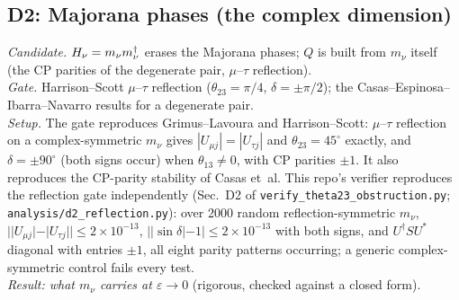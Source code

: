 \subsection{D2: Majorana phases (the complex dimension)}\label{sec:D2}
\emph{Candidate.} $H_\nu=m_\nu m_\nu^\dagger$ erases the Majorana phases; $Q$ is built from
$m_\nu$ itself (the CP parities of the degenerate pair, $\mu$--$\tau$ reflection).\\
\emph{Gate.} Harrison--Scott $\mu$--$\tau$ reflection ($\theta_{23}=\pi/4$, $\delta=\pm\pi/2$);
the Casas--Espinosa--Ibarra--Navarro results for a degenerate pair.\\
\emph{Setup.} The gate reproduces Grimus--Lavoura and Harrison--Scott: $\mu$--$\tau$ reflection on
a complex-symmetric $m_\nu$ gives $|U_{\mu j}|=|U_{\tau j}|$ and $\theta_{23}=45^\circ$ exactly,
and $\delta=\pm90^\circ$ (both signs occur) when $\theta_{13}\neq0$, with CP parities $\pm1$. It
also reproduces the CP-parity stability of Casas et~al. This repo's verifier reproduces the
reflection gate independently (Sec.~D2 of \texttt{verify\_theta23\_obstruction.py};
\texttt{analysis/d2\_reflection.py}): over 2000 random reflection-symmetric $m_\nu$,
$||U_{\mu j}|-|U_{\tau j}||\le2\times10^{-13}$, $||\sin\delta|-1|\le2\times10^{-13}$ with both signs,
and $U^\dagger S U^*$ diagonal with entries $\pm1$, all eight parity patterns occurring; a generic
complex-symmetric control fails every test.\\
\emph{Result: what $m_\nu$ carries at $\varepsilon\to0$} (rigorous, checked against a closed form).
